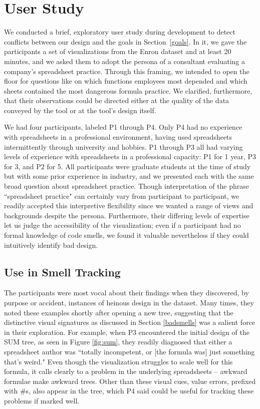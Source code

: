 \documentclass[conference]{IEEEtran}
\begin{document}
	\section{User Study} \label{sec:userstudy} 

	We conducted a brief, exploratory user study during development to detect
	conflicts between our design and the goals in Section~\ref{goals}. In it, we
	gave the participants a set of visualizations from the Enron dataset and at
	least 20 minutes, and we asked them to adopt the persona of a consultant
	evaluating a company's spreadsheet practice. Through this framing, we intended
	to open the floor for questions like on which functions employees most depended
	and which sheets contained the most dangerous formula practice. We clarified,
	furthermore, that their observations could be directed either at the quality of
	the data conveyed by the tool or at the tool's design itself. \par
	
	We had four participants, labeled P1 through P4. Only P4 had no experience with
	spreadsheets in a professional environment, having used spreadsheets
	intermittently through university and hobbies. P1 through P3 all had varying
	levels of experience with spreadsheets in a professional capacity: P1 for 1
	year, P3 for 3, and P2 for 5. All participants were graduate students at the
	time of study but with some prior experience in industry, and we presented each
	with the same broad question about spreadsheet practice. Though interpretation
	of the phrase ``spreadsheet practice" can certainly vary from participant to
	participant, we readily accepted this interpretive flexibility since we wanted
	a range of views and backgrounds despite the persona. Furthermore, their
	differing levels of expertise let us judge the accessibility of the
	visualization; even if a participant had no formal knowledge of code smells, we
	found it valuable nevertheless if they could intuitively identify bad design.
	
	\subsection{Use in Smell Tracking}
	
	The participants were most vocal about their findings when they discovered, by
	purpose or accident, instances of heinous design in the dataset. Many times,
	they noted these examples shortly after opening a new tree, suggesting that the
	distinctive visual signatures as discussed in Section \ref{badsmells} was a
	salient force in their exploration. For example, when P3 encountered the
	initial design of the SUM tree, as seen in Figure \ref{fig:sum}, they readily
	diagnosed that either a spreadsheet author was ``totally incompetent, or [the
	formula was] just something that's weird." Even though the visualization
	struggles to scale well for this formula, it calls clearly to a problem in the
	underlying spreadsheets -- awkward formulae make awkward trees. Other than
	these visual cues, value errors, prefixed with \#s, also appear in the tree,
	which P4 said could be useful for tracking these problems if marked well.
	
\end{document}
